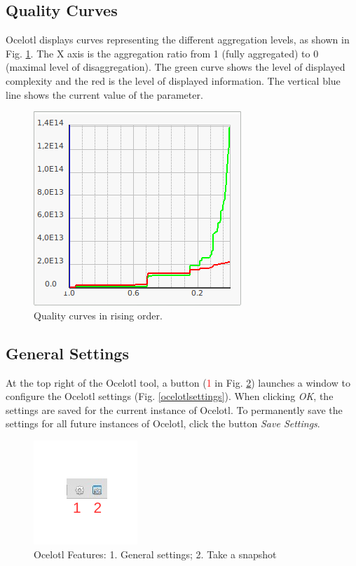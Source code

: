 \documentclass[twoside]{article}
\begin{document}
\begin{sloppypar}
\subsection{Quality Curves}
Ocelotl displays curves representing the different aggregation levels, as shown in Fig. \ref{aggregCurves}. The X axis is the aggregation ratio from 1 (fully aggregated) to 0 (maximal level of disaggregation). %
The green curve shows the level of displayed complexity and the red is the level of displayed information. 
The vertical blue line shows the current value of the parameter.

\begin{figure}[h!]
	\centering
	\includegraphics[scale=0.5]{images/ocelotlCurves.png}
	\caption{Quality curves in rising order.}
	\label{aggregCurves}
\end{figure}

\subsection{General Settings}
At the top right of the Ocelotl tool, a button (\textcolor{red}{1} in Fig. \ref{ocelotlButtons}) launches a window to configure the Ocelotl settings (Fig. \ref{ocelotlsettings}). When clicking \textit{OK}, the settings are saved for the current instance of Ocelotl. To permanently save the settings for all future instances of Ocelotl, click the button \textit{Save Settings}.

\begin{figure}[h!]
	\centering
	\includegraphics[scale=1.5]{images/ocelotlButtons.pdf}
	\caption{Ocelotl Features: 1. General settings; 2. Take a snapshot}
	\label{ocelotlButtons}
\end{figure}


\end{sloppypar}
\end{document}

